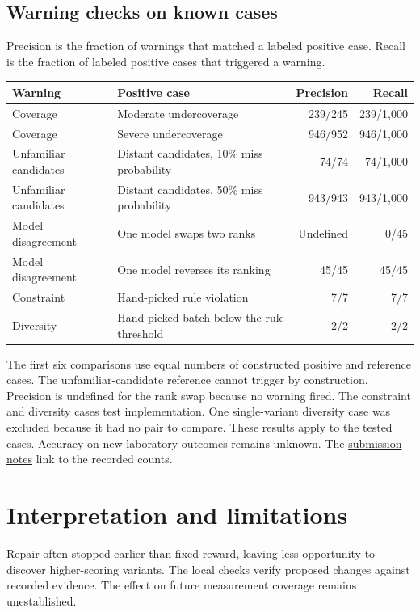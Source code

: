 \documentclass[11pt,a4paper]{article}
\begin{document}
\subsection{Warning checks on known cases}
Precision is the fraction of warnings that matched a labeled positive case. Recall is the fraction of labeled positive cases that triggered a warning.

\begin{center}
\begin{tabular}{@{}p{3.6cm}p{5.7cm}rr@{}}
\toprule
Warning & Positive case & Precision & Recall \\
\midrule
Coverage & Moderate undercoverage & 239/245 & 239/1,000 \\
Coverage & Severe undercoverage & 946/952 & 946/1,000 \\
Unfamiliar candidates & Distant candidates, 10\% miss probability & 74/74 & 74/1,000 \\
Unfamiliar candidates & Distant candidates, 50\% miss probability & 943/943 & 943/1,000 \\
Model disagreement & One model swaps two ranks & Undefined & 0/45 \\
Model disagreement & One model reverses its ranking & 45/45 & 45/45 \\
Constraint & Hand-picked rule violation & 7/7 & 7/7 \\
Diversity & Hand-picked batch below the rule threshold & 2/2 & 2/2 \\
\bottomrule
\end{tabular}
\end{center}
The first six comparisons use equal numbers of constructed positive and reference cases. The unfamiliar-candidate reference cannot trigger by construction. Precision is undefined for the rank swap because no warning fired. The constraint and diversity cases test implementation. One single-variant diversity case was excluded because it had no pair to compare. These results apply to the tested cases. Accuracy on new laboratory outcomes remains unknown. The \href{../../research/submission_readiness.md}{submission notes} link to the recorded counts.

\section{Interpretation and limitations}
Repair often stopped earlier than fixed reward, leaving less opportunity to discover higher-scoring variants. The local checks verify proposed changes against recorded evidence. The effect on future measurement coverage remains unestablished.
\end{document}

